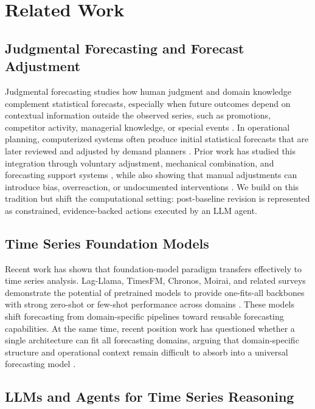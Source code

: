 \documentclass{article}
\theoremstyle{plain}
\theoremstyle{definition}
\theoremstyle{remark}
\begin{document}
\section{Related Work}

\subsection{Judgmental Forecasting and Forecast Adjustment}
Judgmental forecasting studies how human judgment and domain knowledge complement statistical forecasts, especially when future outcomes depend on contextual information outside the observed series, such as promotions, competitor activity, managerial knowledge, or special events \cite{lawrence2006judgmental,webby1996judgemental}. In operational planning, computerized systems often produce initial statistical forecasts that are later reviewed and adjusted by demand planners \cite{fildes2009effective}. Prior work has studied this integration through voluntary adjustment, mechanical combination, and forecasting support systems \cite{goodwin2002integrating,goodwin2007process,webby2005forecasting}, while also showing that manual adjustments can introduce bias, overreaction, or undocumented interventions \cite{fildes2009effective,goodwin2002integrating}. We build on this tradition but shift the computational setting: post-baseline revision is represented as constrained, evidence-backed actions executed by an LLM agent.


\subsection{Time Series Foundation Models}

Recent work has shown that foundation-model paradigm transfers effectively to time series analysis. Lag-Llama, TimesFM, Chronos, Moirai, and related surveys demonstrate the potential of pretrained models to provide one-fits-all backbones with strong zero-shot or few-shot performance across domains \cite{rasul2023lag,das2023decoder,ansari2024chronos,woo2024unified,liang2024foundation}. These models shift forecasting from domain-specific pipelines toward reusable forecasting capabilities. At the same time, recent position work has questioned whether a single architecture can fit all forecasting domains, arguing that domain-specific structure and operational context remain difficult to absorb into a universal forecasting model \cite{ma2026position}.

\subsection{LLMs and Agents for Time Series Reasoning}
\end{document}
